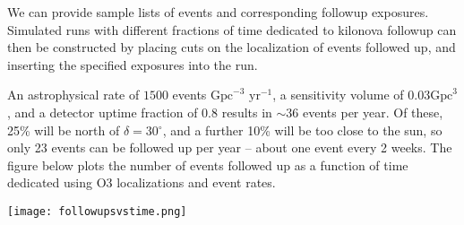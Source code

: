 \documentclass[a4paper,10pt]{article}
\newcommand{\degree}{\ensuremath{^{\circ}}}
\begin{document}
We can provide sample lists of events and corresponding followup exposures. Simulated runs with different fractions of time dedicated to kilonova followup can then be constructed by placing cuts on the localization of events followed up, and inserting the specified exposures into the run.

An astrophysical rate of $1500$ events $\mbox{Gpc}^{-3}$ $\mbox{yr}^{-1}$, a sensitivity volume of $0.03 \mbox{Gpc}^3$, and a detector uptime fraction of $0.8$ results in $\sim 36$ events per year. Of these, 25\% will be north of $\delta=30\degree$, and a further 10\% will be too close to the sun, so only 23 events can be followed up per year -- about one event every 2 weeks. The figure below plots the number of events followed up as a function of time dedicated using O3 localizations and event rates.

\begin{minipage}{\columnwidth}
\centering
 \texttt{[image: followupsvstime.png]}
 \label{fig:followupsvstime}
\end{minipage}

\end{document}
